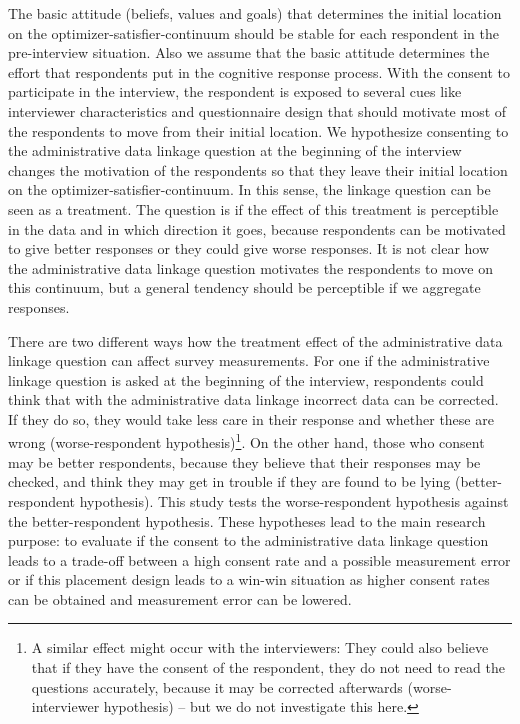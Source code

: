 The basic attitude (beliefs, values and goals) that determines the initial location on the optimizer-satisfier-continuum should be stable for each respondent in the pre-interview situation. Also we assume that the basic attitude determines the effort that respondents put in the cognitive response process. With the consent to participate in the interview, the respondent is exposed to several cues like interviewer characteristics and questionnaire design that should motivate most of the respondents to move from their initial location. We hypothesize consenting to the administrative data linkage question at the beginning of the interview changes the motivation of the respondents so that they leave their initial location on the optimizer-satisfier-continuum. In this sense, the linkage question can be seen as a treatment. The question is if the effect of this treatment is perceptible in the data and in which direction it goes, because respondents can be motivated to give better responses or they could give worse responses. It is not clear how the administrative data linkage question motivates the respondents to move on this continuum, but a general tendency should be perceptible if we aggregate responses.

There are two different ways how the treatment effect of the administrative data linkage question can affect survey measurements. For one if the administrative linkage question is asked at the beginning of the interview, respondents could think that with the administrative data linkage incorrect data can be corrected. If they do so, they would take less care in their response and whether these are wrong (worse-respondent hypothesis)\footnote{A similar effect might occur with the interviewers: They could also believe that if they have the consent of the respondent, they do not need to read the questions accurately, because it may be corrected afterwards (worse-interviewer hypothesis) -- but we do not investigate this here.}. On the other hand, those who consent may be better respondents, because they believe that their responses may be checked, and think they may get in trouble if they are found to be lying (better-respondent hypothesis). This study tests the worse-respondent hypothesis against the better-respondent hypothesis. These hypotheses lead to the main research purpose: to evaluate if the consent to the administrative data linkage question leads to a trade-off between a high consent rate and a possible measurement error or if this placement design leads to a win-win situation as higher consent rates can be obtained and measurement error can be lowered.

